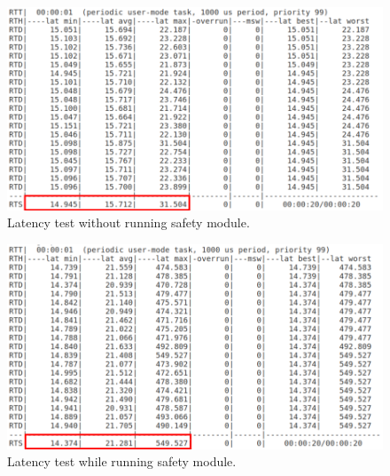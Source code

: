 \documentclass[12pt]{scrreprt}
\begin{document}
\begin{figure}[H]
    \centering
    \includegraphics[width=\textwidth]{Figures/results/stat/latency_with_frame_no_sm.png}
    \caption{Latency test without running safety module.}
    \label{fig:lat_without_sm}
\end{figure}


\begin{figure}[H]
    \centering
    \includegraphics[width=\textwidth]{Figures/results/stat/latency_with_frame_sm.png}
    \caption{Latency test while running safety module.}
    \label{fig:lat_with_sm}
\end{figure}


\end{document}
